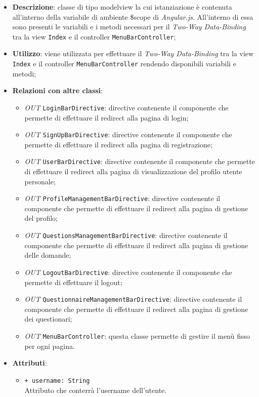 \begin{itemize}
	\item \textbf{Descrizione}: classe di tipo modelview la cui istanziazione è contenuta all'interno della variabile di ambiente \$scope di \textit{Angular.js}. All'interno di essa sono presenti le variabili e i metodi necessari per il \textit{Two-Way Data-Binding} tra la view \texttt{Index} e il controller \texttt{MenuBarController};
	\item \textbf{Utilizzo}: viene utilizzata per effettuare il \textit{Two-Way Data-Binding} tra la view \texttt{Index} e il controller \texttt{MenuBarController} rendendo disponibili variabili e metodi;
	\item \textbf{Relazioni con altre classi}: 
	\begin{itemize}
		\item \textit{OUT} \texttt{LoginBarDirective}: directive contenente il componente che permette di effettuare il redirect alla pagina di login;
		\item \textit{OUT} \texttt{SignUpBarDirective}: directive contenente il componente che permette di effettuare il redirect alla pagina di registrazione;
		\item \textit{OUT} \texttt{UserBarDirective}: directive contenente il componente che permette di effettuare il redirect alla pagina di visualizzazione del profilo utente personale;
		\item \textit{OUT} \texttt{ProfileManagementBarDirective}: directive contenente il componente che permette di effettuare il redirect alla pagina di gestione del profilo;
		\item \textit{OUT} \texttt{QuestionsManagementBarDirective}: directive contenente il componente che permette di effettuare il redirect alla pagina di gestione delle domande;
		\item \textit{OUT} \texttt{LogoutBarDirective}: directive contenente il componente che permette di effettuare il logout;
		\item \textit{OUT} \texttt{QuestionnaireManagementBarDirective}: directive contenente il componente che permette di effettuare il redirect alla pagina di gestione dei questionari;
		\item \textit{OUT} \texttt{MenuBarController}: questa classe permette di gestire il menù fisso per ogni pagina.
	\end{itemize}
	\item \textbf{Attributi}: 
	\begin{itemize}
		\item \texttt{+ username: String} \\ Attributo che conterrà l'username dell'utente.

\end{itemize}
\end{itemize}
